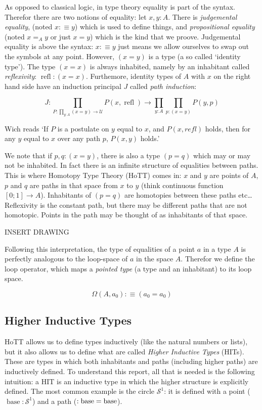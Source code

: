 \documentclass{article}
\let\loop\relax
\DeclareMathOperator{\loop}{loop}
\DeclareMathOperator{\base}{base}
\DeclareMathOperator{\refl}{refl}
\begin{document}
As opposed to classical logic, in type theory equality is part of the syntax. Therefor there are two notions of equality: let $x,y : A$. There is \emph{judgemental equality}, (noted $x :\equiv y$) which is used to define things, and \emph{propositional equality} (noted $x =_{A} y$ or just $x = y$) which is the kind that we proove. Judgemental equality is above the syntax: $x :\equiv y$ just means we allow ourselves to swap out the symbols at any point. However, $(x = y)$ is a type (a so called `identity type'). The type $(x = x)$ is always inhabited, namely by an inhabitant called \emph{reflexivity}: $\refl : (x = x)$. Furthemore, identity types of $A$ with $x$ on the right hand side have an induction principal $J$ called \emph{path induction}:

\[J : \prod_{P : \prod_{y : A} (x = y) \to \mathcal{U}} P(x, \refl) \to \prod_{y: A} \prod_{p : (x = y)} P(y,p)\]

Wich reads `If $P$ is a postulate on $y$ equal to $x$, and $P(x,refl)$ holds, then for any $y$ equal to $x$ over any path $p$, $P(x,y)$ holds.'

We note that if $p,q : (x = y)$, there is also a type $(p = q)$ which may or may not be inhabited. In fact there is an infinite structure of equalities between paths. This is where Homotopy Type Theory (HoTT) comes in: $x$ and $y$ are points of $A$, $p$ and $q$ are paths in that space from $x$ to $y$ (think continuous function $\left[ 0;1\right] \to A$). Inhabitants of $(p = q)$ are homotopies between these paths etc\ldots Reflexivity is the constant path, but there may be different paths that are not homotopic. Points in the path may be thought of as inhabitants of that space.

INSERT DRAWING

Following this interpretation, the type of equalities of a point $a$ in a type $A$ is perfectly analogous to the loop-space of $a$ in the space $A$. Therefor we define the loop operator, which maps a \emph{pointed type} (a type and an inhabitant) to its loop space.

\[\Omega(A , a_0) :\equiv (a_0 = a_0)\]

\subsection{Higher Inductive Types}

HoTT allows us to define types inductively (like the natural numbers or lists), but it also allows us to define what are called \emph{Higher Inductive Types} (HITs). These are types in which both inhabitants and paths (including higher paths) are inductively defined. To understand this report, all that is needed is the following intuition: a HIT is an inductive type in which the higher structure is explicitly defined. The most common example is the circle $\mathcal{S}^{1}$: it is defined with a point ($\base : \mathcal{S}^{1}$) and a path ($\loop : \base = \base$).
\end{document}
